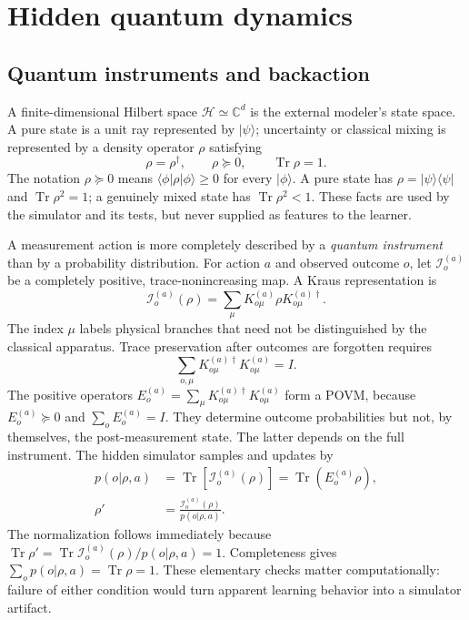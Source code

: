 \documentclass[11pt]{article}
\newcommand{\Tr}{\operatorname{Tr}}
\begin{document}
\section{Hidden quantum dynamics}
\label{sec:quantum}

\subsection{Quantum instruments and backaction}

A finite-dimensional Hilbert space $\mathcal H\simeq\mathbb C^d$ is the
external modeler's state space. A pure state is a unit ray represented by
$|\psi\rangle$; uncertainty or classical mixing is represented by a density
operator $\rho$ satisfying
\begin{equation}
 \rho=\rho^\dagger,\qquad \rho\succeq0,\qquad \Tr\rho=1.
\end{equation}
The notation $\rho\succeq0$ means
$\langle\phi|\rho|\phi\rangle\geq0$ for every $|\phi\rangle$. A pure state has
$\rho=|\psi\rangle\!\langle\psi|$ and $\Tr\rho^2=1$; a genuinely mixed state
has $\Tr\rho^2<1$. These facts are used by the simulator and its tests, but
never supplied as features to the learner.

A measurement action is more completely described by a \emph{quantum
instrument} than by a probability distribution. For action $a$ and observed
outcome $o$, let $\mathcal I_o^{(a)}$ be a completely positive,
trace-nonincreasing map. A Kraus representation is
\begin{equation}
 \mathcal I_o^{(a)}(\rho)=\sum_{\mu}
 K_{o\mu}^{(a)}\rho K_{o\mu}^{(a)\dagger}.
 \label{eq:instrument-map}
\end{equation}
The index $\mu$ labels physical branches that need not be distinguished by the
classical apparatus. Trace preservation after outcomes are forgotten requires
\cite{kraus1983,nielsen2010}
\begin{equation}
 \sum_{o,\mu} K_{o\mu}^{(a)\dagger}K_{o\mu}^{(a)}=I. \label{eq:complete}
\end{equation}
The positive operators
$E_o^{(a)}=\sum_\mu K_{o\mu}^{(a)\dagger}K_{o\mu}^{(a)}$ form a POVM, because
$E_o^{(a)}\succeq0$ and $\sum_oE_o^{(a)}=I$. They determine outcome
probabilities but not, by themselves, the post-measurement state. The latter
depends on the full instrument. The hidden simulator samples and updates by
\begin{align}
 p(o|\rho,a)&=\Tr\!\left[\mathcal I_o^{(a)}(\rho)\right]
             =\Tr(E_o^{(a)}\rho), \label{eq:born}\\
 \rho'&=\frac{\mathcal I_o^{(a)}(\rho)}{p(o|\rho,a)}. \label{eq:update}
\end{align}
The normalization follows immediately because
$\Tr\rho'=\Tr\mathcal I_o^{(a)}(\rho)/p(o|\rho,a)=1$. Completeness gives
$\sum_op(o|\rho,a)=\Tr\rho=1$. These elementary checks matter computationally:
failure of either condition would turn apparent learning behavior into a
simulator artifact.
\end{document}
